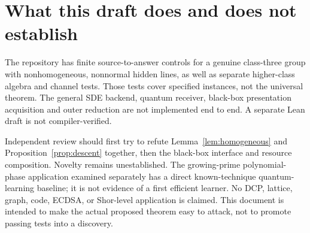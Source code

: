 \documentclass[11pt]{article}
\theoremstyle{remark}
\begin{document}
\section{What this draft does and does not establish}
The repository has finite source-to-answer controls for a genuine
class-three group with nonhomogeneous, nonnormal hidden lines, as well as
separate higher-class algebra and channel tests. Those tests cover specified
instances, not the universal theorem. The general SDE backend, quantum
receiver, black-box presentation acquisition and outer reduction are not
implemented end to end. A separate Lean draft is not compiler-verified.

Independent review should first try to refute
Lemma~\ref{lem:homogeneous} and Proposition~\ref{prop:descent} together,
then the black-box interface and resource composition. Novelty remains
unestablished. The growing-prime polynomial-phase application examined
separately has a direct known-technique quantum-learning baseline; it is
not evidence of a first efficient learner. No DCP, lattice, graph, code,
ECDSA, or Shor-level application is claimed. This document is intended to
make the actual proposed theorem easy to attack, not to promote passing
tests into a discovery.
\end{document}
